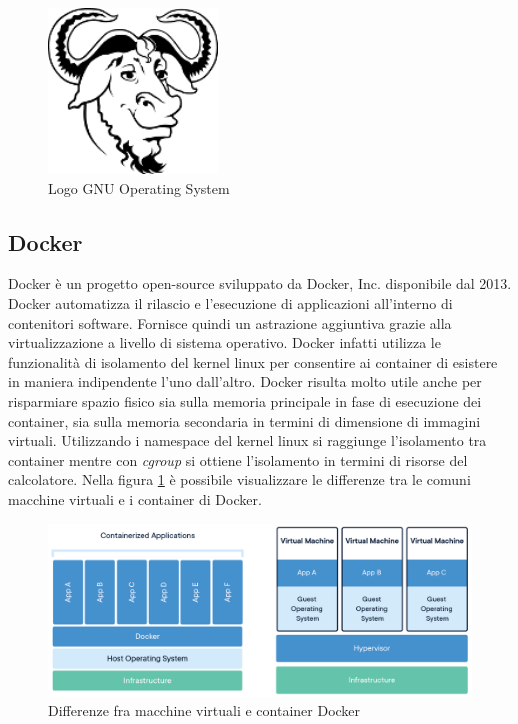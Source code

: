         \begin{figure}[H]
            \centering
            \includegraphics[width=0.4\textwidth]{figure/gnu_make.png}
            \caption{Logo GNU Operating System}
        \end{figure}

    \subsection{Docker}\label{docker}
    Docker è un progetto open-source sviluppato da Docker, Inc. disponibile dal 2013.
    Docker automatizza il rilascio e l'esecuzione di applicazioni all'interno di contenitori
    software. Fornisce quindi un astrazione aggiuntiva grazie alla virtualizzazione a
    livello di sistema operativo. Docker infatti utilizza le funzionalità di isolamento del
    kernel linux per consentire ai container di esistere in maniera indipendente l'uno dall'altro.
    Docker risulta molto utile anche per risparmiare spazio fisico sia sulla memoria principale
    in fase di esecuzione dei container, sia sulla memoria secondaria in termini di dimensione di
    immagini virtuali. Utilizzando i namespace del kernel linux si raggiunge l'isolamento tra container
    mentre con \textit{cgroup} si ottiene l'isolamento in termini di risorse del calcolatore.
    Nella figura \ref*{docker-scheme} è possibile visualizzare le differenze tra le comuni macchine
    virtuali e i container di Docker.
    \begin{figure}[H]\label{docker-scheme}
        \centering
        \includegraphics[width=\linewidth]{figure/docker-scheme.png}
        \caption{Differenze fra macchine virtuali e container Docker}
    \end{figure}
